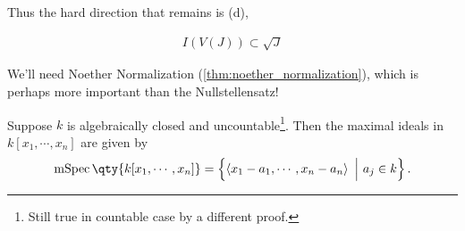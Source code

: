 Thus the hard direction that remains is (d),

\begin{align*}
I(V(J)) \subset \sqrt{J}
\end{align*}

\begin{warnings}

We'll need Noether Normalization (\cref{thm:noether_normalization}),
which is perhaps more important than the Nullstellensatz!

\end{warnings}

\begin{theorem}\label{thm:nullstellensatz_one}

Suppose \(k\) is algebraically closed and uncountable\footnote{Still
  true in countable case by a different proof.}. Then the maximal ideals
in \(k[x_1, \cdots, x_n]\) are given by
\begin{align*}  
\operatorname{mSpec}\qty{k[x_1, \cdots, x_{n}]} = \left\{{ \left\langle{x_1 - a_1, \cdots, x_n - a_n}\right\rangle {~\mathrel{\Big|}~}a_j\in k}\right\}
.\end{align*}

\end{theorem}

